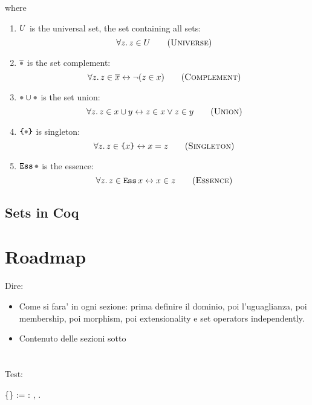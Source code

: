 \documentclass[sigplan,10pt,anonymous,review]{acmart}\settopmatter{printfolios=true,printccs=false,printacmref=false}
\begin{document}
where
\begin{enumerate} \renewcommand\labelitemi{--}
  \item $U$ is the universal set, \ie{} the set containing all sets:
    \[ \forall z.\, z \in \Universe \sctag{Universe} \]
  \item $\Complement \Placeholder$ is the set complement:
    \[ \forall z.\, z \in \Complement x \leftrightarrow \neg (z \in x) \sctag{Complement}\]
  \item $\Union \Placeholder \Placeholder$ is the set union:
    \[ \forall z.\, z \in \Union x y \leftrightarrow z \in x \lor z \in y \sctag{Union} \]
  \item $\Sing\Placeholder$ is singleton:
    \[ \forall z.\, z \in \Sing x \leftrightarrow x = z \sctag{Singleton} \]
  \item $\Essence\Placeholder$ is the essence:
    \[ \forall z.\, z \in \Essence{x} \leftrightarrow x \in z \sctag{Essence} \]
\end{enumerate}

\subsection{Sets in Coq}


\section{Roadmap}
Dire:
\begin{itemize}
  \item Come si fara' in ogni sezione: prima definire il dominio, poi l'uguaglianza, poi membership, poi morphism, poi extensionality e set operators independently.
  \item Contenuto delle sezioni sotto
\end{itemize}

\section{\NFTWO}


\section{\NFO}

Test:

\begin{coqdoccode}
  \coqdocnoindent
  \Definition{}  \{\}   := \Math\forall {}: ,   \Math\leftrightarrow{}  .\coqdoceol
  \coqdocemptyline
\end{coqdoccode}
\end{document}
